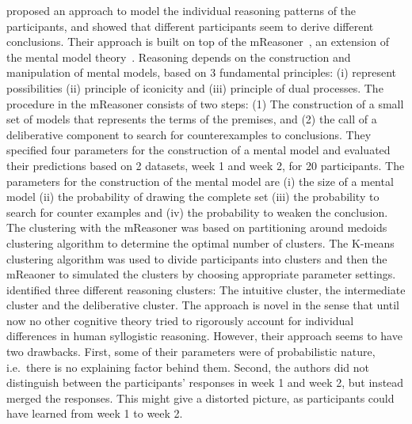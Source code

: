\documentclass[12pt]{article}
\begin{document}
\cite{khemlani:2016} proposed an approach to model the individual reasoning patterns of the participants, and 
showed that different participants seem to derive different conclusions.
Their approach is built on top of the mReasoner~\cite{khemlani:2013}, an extension of the mental model theory~\cite{johnsonlaird:1983}.
Reasoning depends on the construction and manipulation of mental models, based on 3 fundamental principles: 
(i) represent possibilities (ii) principle of iconicity and (iii) principle of dual processes.
 The procedure in the mReasoner consists of two steps:
(1) The construction of a small set of models that represents the terms of the premises, and
(2) the call of a deliberative component to search for counterexamples to conclusions.
They specified four parameters for the construction of a mental model and evaluated their
predictions based on 2 datasets, week 1 and week 2, for 20 participants.
The parameters for the construction of the mental model are (i) the 
size of a mental model (ii) the probability of drawing the complete set 
(iii) the probability to search for counter examples 
and (iv) the probability to weaken the conclusion.
The clustering with the mReasoner was based on partitioning around medoids clustering algorithm to determine the optimal number of clusters.
The K-means clustering algorithm was used to divide participants into clusters and then
the mReaoner to simulated the clusters by choosing appropriate parameter settings.
\cite{khemlani:2016} identified three different reasoning clusters: The intuitive cluster, the intermediate cluster and the deliberative cluster.
The approach is novel in the sense that until now no other cognitive theory tried to rigorously account for individual differences in human syllogistic reasoning. However, their approach seems to have two drawbacks. First, some of their 
parameters were of probabilistic nature, i.e.\ there is no explaining factor behind them. Second, the authors did not distinguish between the participants' 
responses in week 1 and week 2, but instead merged the responses. This might give a distorted picture, as participants could
have learned from week 1 to week 2.

\end{document}
